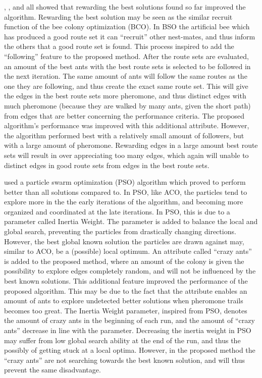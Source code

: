 \citet{salehi-nezhad07}, \citet{tripathi09}, and \citet{sedighpour14} all showed that rewarding the best solutions found so far improved the algorithm. Rewarding the best solution may be seen as the similar recruit function of the bee colony optimization (BCO). In BSO the artificial bee which has produced a good route set it can ``recruit'' other nest-mates, and thus inform the others that a good route set is found. This process inspired to add the ``following'' feature to the proposed method. After the route sets are evaluated, an amount of the best ants with the best route sets is selected to be followed in the next iteration. The same amount of ants will follow the same routes as the one they are following, and thus create the exact same route set. This will give the edges in the best route sets more pheromone, and thus distinct edges with much pheromone (because they are walked by many ants, given the short path) from edges that are better concerning the performance criteria. The proposed algorithm's performance was improved with this additional attribute. However, the algorithm performed best with a relatively small amount of followers, but with a large amount of pheromone.  Rewarding edges in a large amount best route sets will result in over appreciating too many edges, which again will unable to distinct edges in good route sets from edges in the best route sets.  %

\citet{kechagiopoulos14} used a particle swarm optimization (PSO) algorithm which proved to perform better than all solutions compared to. In PSO, like ACO, the particles tend to explore more in the the early iterations of the algorithm, and becoming more organized and coordinated at the late iterations. In PSO, this is due to a parameter called Inertia Weight. The parameter is added to balance the local and global search, preventing the particles from drastically changing directions. However, the best global known solution the particles are drawn against may, similar to ACO, be a (possible) local optimum. An attribute called ``crazy ants'' is added to the proposed method, where an amount of the colony is given the possibility to explore edges completely random, and will not be influenced by the best known solutions. This additional feature improved the performance of the proposed algorithm. This may be due to the fact that the attribute enables an amount of ants to explore undetected better solutions when pheromone trails becomes too great. The Inertia Weight parameter, inspired from PSO, denotes the amount of crazy ants in the beginning of each run, and the amount of ``crazy ants'' decrease in line with the parameter. Decreasing the inertia weight in PSO may suffer from low global search ability at the end of the run, and thus the possibly of getting stuck at a local optima. However, in the proposed method the ``crazy ants'' are not searching towards the best known solution, and will thus prevent the same disadvantage. 


